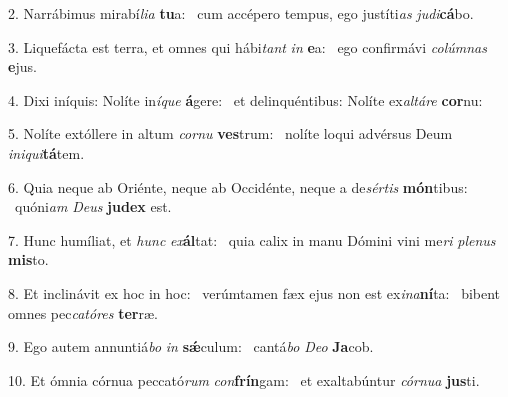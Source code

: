 2. Narrábimus mirabí\textit{li}\textit{a} \textbf{tu}a: \ast\  cum accépero tempus, ego justíti\textit{as} \textit{ju}\textit{di}\textbf{cá}bo.\

3. Liquefácta est terra, et omnes qui hábi\textit{tant} \textit{in} \textbf{e}a: \ast\  ego confirmávi \textit{co}\textit{lúm}\textit{nas} \textbf{e}jus.\

4. Dixi iníquis: Nolíte in\textit{í}\textit{que} \textbf{á}gere: \ast\  et delinquéntibus: Nolíte ex\textit{al}\textit{tá}\textit{re} \textbf{cor}nu:\

5. Nolíte extóllere in altum \textit{cor}\textit{nu} \textbf{ves}trum: \ast\  nolíte loqui advérsus Deum \textit{in}\textit{i}\textit{qui}\textbf{tá}tem.\

6. Quia neque ab Oriénte, neque ab Occidénte, neque a de\textit{sér}\textit{tis} \textbf{món}tibus: \ast\  quóni\textit{am} \textit{De}\textit{us} \textbf{ju}\textbf{dex} est.\

7. Hunc humíliat, et \textit{hunc} \textit{ex}\textbf{ál}tat: \ast\  quia calix in manu Dómini vini me\textit{ri} \textit{ple}\textit{nus} \textbf{mis}to.\

8. Et inclinávit ex hoc in hoc: \dag\  verúmtamen fæx ejus non est ex\textit{i}\textit{na}\textbf{ní}ta: \ast\  bibent omnes pec\textit{ca}\textit{tó}\textit{res} \textbf{ter}ræ.\

9. Ego autem annuntiá\textit{bo} \textit{in} \textbf{sǽ}culum: \ast\  cantá\textit{bo} \textit{De}\textit{o} \textbf{Ja}cob.\

10. Et ómnia córnua peccató\textit{rum} \textit{con}\textbf{frín}gam: \ast\  et exaltabúntur \textit{cór}\textit{nu}\textit{a} \textbf{jus}ti.\

